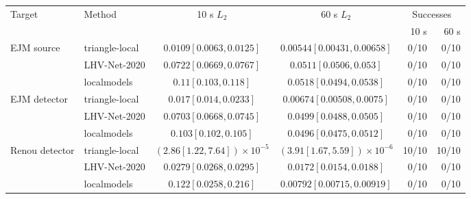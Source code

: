 \setlength{\tabcolsep}{3pt}\begin{tabular}{@{}llccrr@{}}\toprule
Target & Method & 10 s $L_2$ & 60 s $L_2$ & \multicolumn{2}{c}{Successes}\\
 & & & & 10 s & 60 s\\\midrule
EJM source & triangle-local & $0.0109 [0.0063, 0.0125]$ & $0.00544 [0.00431, 0.00658]$ & 0/10 & 0/10\\
 & LHV-Net-2020 & $0.0722 [0.0669, 0.0767]$ & $0.0511 [0.0506, 0.053]$ & 0/10 & 0/10\\
 & localmodels & $0.11 [0.103, 0.118]$ & $0.0518 [0.0494, 0.0538]$ & 0/10 & 0/10\\
\midrule
EJM detector & triangle-local & $0.017 [0.014, 0.0233]$ & $0.00674 [0.00508, 0.0075]$ & 0/10 & 0/10\\
 & LHV-Net-2020 & $0.0703 [0.0668, 0.0745]$ & $0.0499 [0.0488, 0.0505]$ & 0/10 & 0/10\\
 & localmodels & $0.103 [0.102, 0.105]$ & $0.0496 [0.0475, 0.0512]$ & 0/10 & 0/10\\
\midrule
Renou detector & triangle-local & $(2.86 [1.22, 7.64])\times10^{-5}$ & $(3.91 [1.67, 5.59])\times10^{-6}$ & 10/10 & 10/10\\
 & LHV-Net-2020 & $0.0279 [0.0268, 0.0295]$ & $0.0172 [0.0154, 0.0188]$ & 0/10 & 0/10\\
 & localmodels & $0.122 [0.0258, 0.216]$ & $0.00792 [0.00715, 0.00919]$ & 0/10 & 0/10\\
\bottomrule\end{tabular}
